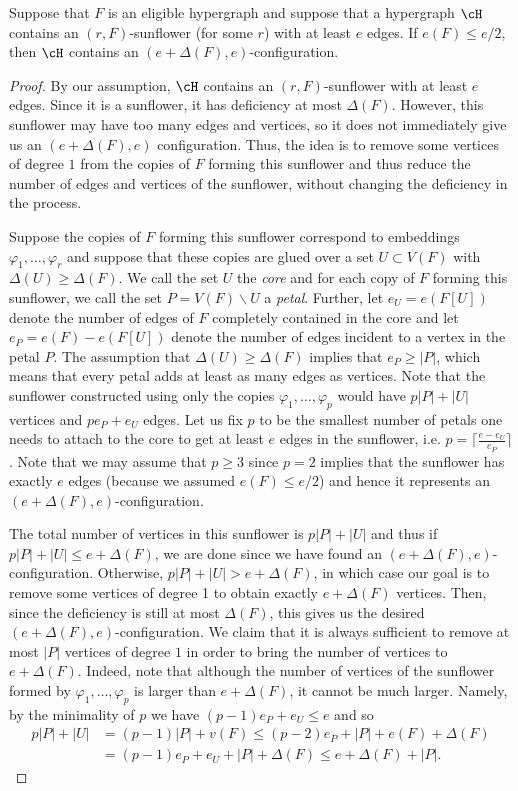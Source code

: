 \begin{lemma}\label{lemma:sunflower}
Suppose that $F$ is an eligible hypergraph and suppose that a hypergraph $\cH$ contains an $(r, F)$-sunflower (for some $r$) with at least $e$ edges. If $e(F)\leq e/2$, then $\cH$ contains an $(e+\Delta(F), e)$-configuration.
\end{lemma}
\begin{proof}
By our assumption, $\cH$ contains an $(r, F)$-sunflower with at least $e$ edges. Since it is a sunflower, it has deficiency at most $\Delta(F)$. However, this sunflower may have too many edges and vertices, so it does not immediately give us an $(e+\Delta(F), e)$ configuration. Thus, the idea is to remove some vertices of degree $1$ from the copies of $F$ forming this sunflower and thus reduce the number of edges and vertices of the sunflower, without changing the deficiency in the process.

Suppose the copies of $F$ forming this sunflower correspond to embeddings $\varphi_1, \dots, \varphi_r$ and suppose that these copies are glued over a set $U\subset V(F)$ with $\Delta(U)\geq \Delta(F)$. We call the set $U$ the \textit{core} and  for each copy of $F$ forming this sunflower, we call the set $P=V(F)\backslash U$ a \textit{petal}. Further, let $e_U=e(F[U])$ denote the number of edges of $F$ completely contained in the core and let $e_P=e(F)-e(F[U])$ denote the number of edges incident to a vertex in the petal $P$. The assumption that $\Delta(U)\geq \Delta(F)$ implies that $e_P\geq |P|$, which means that every petal adds at least as many edges as vertices. Note that the sunflower constructed using only the copies $\varphi_1, \dots, \varphi_p$ would have $p|P|+|U|$ vertices and $pe_P+e_U$ edges. Let us fix $p$ to be the smallest number of petals one needs to attach to the core to get at least $e$ edges in the sunflower, i.e. $p=\lceil\frac{e-e_U}{e_P}\rceil$. Note that we may assume that $p\geq 3$ since $p=2$ implies that the sunflower has exactly $e$ edges (because we assumed $e(F) \le e/2$) and hence it represents an $( e+\Delta(F), e)$-configuration.

The total number of vertices in this sunflower is $p|P|+|U|$ and thus if $p|P|+|U|\leq e+\Delta(F)$, we are done since we have found an $(e+\Delta(F), e)$-configuration. Otherwise, $p|P|+|U|> e+\Delta(F)$, in which case our goal is to remove some vertices of degree 1 to obtain exactly $e+\Delta(F)$ vertices. Then, since the deficiency is still at most $\Delta(F)$, this gives us the desired $(e+\Delta(F), e)$-configuration. We claim that it is always sufficient to remove at most $|P|$ vertices of degree $1$ in order to bring the number of vertices to $e+\Delta(F)$. Indeed, note that although the number of vertices of the sunflower formed by $\varphi_1, \dots, \varphi_p$ is larger than $e+\Delta(F)$, it cannot be much larger. Namely, by the minimality of $p$ we have $(p-1) e_P+e_U\leq e$ and so 
\begin{align*}
    p|P|+|U|&= (p-1)|P|+ v(F)\leq (p-2)e_P + |P| + e(F)+\Delta(F)\\
    &= (p-1)e_P+e_U+|P|+\Delta(F)\leq e+\Delta(F)+|P|.
\end{align*}


\end{proof}
